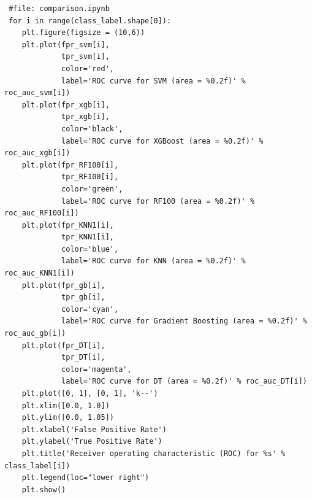 \documentclass[
	article,			%
	11pt,				%
	oneside,			%
	a4paper,			%
	english,			%
	brazil,				%
	sumario=tradicional
	]{abntex2}
\begin{document}
\begin{verbatim}
 #file: comparison.ipynb
 for i in range(class_label.shape[0]):
    plt.figure(figsize = (10,6))
    plt.plot(fpr_svm[i], 
             tpr_svm[i],
             color='red', 
             label='ROC curve for SVM (area = %0.2f)' % roc_auc_svm[i])
    plt.plot(fpr_xgb[i], 
             tpr_xgb[i],
             color='black', 
             label='ROC curve for XGBoost (area = %0.2f)' % roc_auc_xgb[i])
    plt.plot(fpr_RF100[i], 
             tpr_RF100[i],
             color='green', 
             label='ROC curve for RF100 (area = %0.2f)' % roc_auc_RF100[i])
    plt.plot(fpr_KNN1[i], 
             tpr_KNN1[i],
             color='blue', 
             label='ROC curve for KNN (area = %0.2f)' % roc_auc_KNN1[i])
    plt.plot(fpr_gb[i], 
             tpr_gb[i],
             color='cyan', 
             label='ROC curve for Gradient Boosting (area = %0.2f)' % roc_auc_gb[i])
    plt.plot(fpr_DT[i], 
             tpr_DT[i],
             color='magenta', 
             label='ROC curve for DT (area = %0.2f)' % roc_auc_DT[i])
    plt.plot([0, 1], [0, 1], 'k--')
    plt.xlim([0.0, 1.0])
    plt.ylim([0.0, 1.05])
    plt.xlabel('False Positive Rate')
    plt.ylabel('True Positive Rate')
    plt.title('Receiver operating characteristic (ROC) for %s' % class_label[i])
    plt.legend(loc="lower right")
    plt.show()
\end{verbatim}
\end{document}
